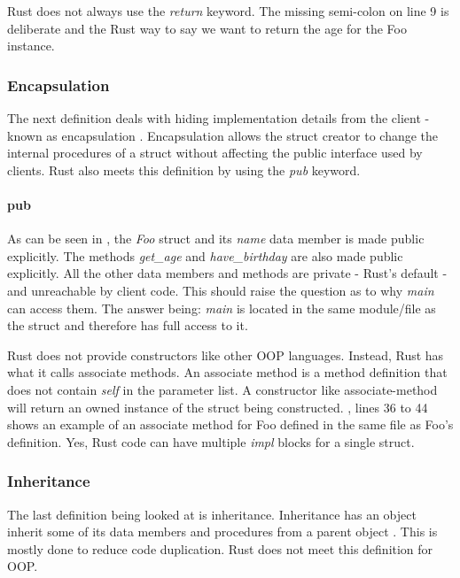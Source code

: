 \documentclass[a4paper,10pt]{article}
\begin{document}
\begin{notebox}
  Rust does not always use the \textit{return} keyword.
  The missing semi-colon on line 9 is deliberate and the Rust way to say we want to return the age for the Foo instance.
\end{notebox}

\subsubsection{Encapsulation}
The next definition deals with hiding implementation details from the client - known as encapsulation \cite{klabnik_2019_01, meyer_97_01}.
Encapsulation allows the struct creator to change the internal procedures of a struct without affecting the public interface used by clients.
Rust also meets this definition by using the \textit{pub} keyword.

\paragraph{pub}
As can be seen in , the \textit{Foo} struct and its \textit{name} data member is made public explicitly.
The methods \textit{get\_age} and \textit{have\_birthday} are also made public explicitly.
All the other data members and methods are private - Rust's default - and unreachable by client code.
This should raise the question as to why \textit{main} can access them.
The answer being: \textit{main} is located in the same module/file as the struct and therefore has full access to it.

\begin{notebox}
  Rust does not provide constructors like other OOP languages.
  Instead, Rust has what it calls associate methods.
  An associate method is a method definition that does not contain \textit{self} in the parameter list.
  A constructor like associate-method will return an owned instance of the struct being constructed.
  , lines 36 to 44 shows an example of an associate method for Foo defined in the same file as Foo's definition.
  Yes, Rust code can have multiple \textit{impl} blocks for a single struct.
\end{notebox}

\subsubsection{Inheritance}
The last definition being looked at is inheritance.
Inheritance has an object inherit some of its data members and procedures from a parent object \cite{meyer_97_01, stefik_85_01, gamma_94_01}.
This is mostly done to reduce code duplication.
Rust does not meet this definition for OOP.
\end{document}
